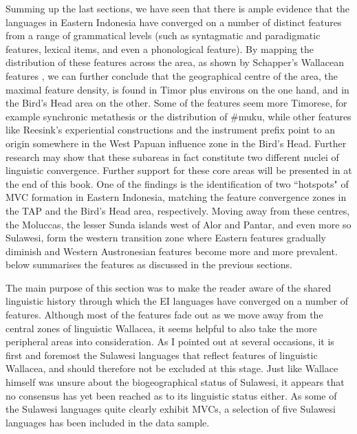 Summing up the last sections, we have seen that there is ample evidence that the languages in Eastern Indonesia have converged on a number of distinct features from a range of grammatical levels (such as syntagmatic and paradigmatic features, lexical items, and even a phonological feature). By mapping the distribution of these features across the area, as shown by Schapper's Wallacean features \citep[138f.]{schapper2015wallacea}, we can further conclude that the geographical centre of the area, the maximal feature density, is found in Timor plus environs on the one hand, and in the Bird's Head area on the other. Some of the features seem more Timorese, for example synchronic metathesis or the distribution of \#muku, while other features like Reesink's experiential constructions and the instrument prefix point to an origin somewhere in the West Papuan influence zone in the Bird's Head. Further research may show that these subareas in fact constitute two different nuclei of linguistic convergence. Further support for these core areas will be presented in  at the end of this book. One of the findings is the identification of two ``hotspots" of MVC formation in Eastern Indonesia, matching the feature convergence zones in the TAP and the Bird's Head area, respectively. Moving away from these centres, the Moluccas, the lesser Sunda islands west of Alor and Pantar, and even more so Sulawesi, form the western transition zone where Eastern  features gradually diminish and Western Austronesian features become more and more prevalent.  below summarises the features as discussed in the previous sections.

The main purpose of this section was to make the reader aware of the shared linguistic history through which the EI languages have converged on a number of features. Although most of the features fade out as we move away from the central zones of linguistic Wallacea, it seems helpful to also take the more peripheral areas into consideration. As I pointed out at several occasions, it is first and foremost the Sulawesi languages that reflect features of linguistic Wallacea, and should therefore not be excluded at this stage. Just like Wallace himself was unsure about the biogeographical status of Sulawesi, it appears that no consensus has yet been reached as to its linguistic status either. As some of the Sulawesi languages quite clearly exhibit MVCs, a selection of five Sulawesi languages has been included in the data sample. 

